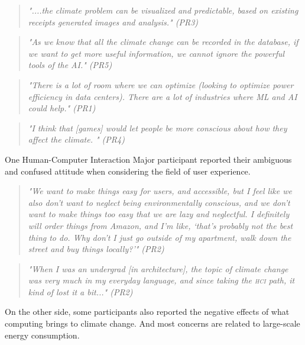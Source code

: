     \begin{quote}
        \textit{
        "....the climate problem can be visualized and predictable, based on existing receipts generated images and analysis." (PR3)
        }
    \end{quote}
    
    \begin{quote}
        \textit{
        "As we know that all the climate change can be recorded in the database, if we want to get more useful information, we cannot ignore the powerful tools of the AI." (PR5)
        }
    \end{quote}
    
    \begin{quote}
        \textit{
        "There is a lot of room where we can optimize (looking to optimize power efficiency in data centers). There are a lot of industries where ML and AI could help." (PR1)
        }
    \end{quote}
    
    \begin{quote}
        \textit{
        "I think that [games] would let people be more conscious about how they affect the climate. " (PR4)
        }
    \end{quote}
    
    One Human-Computer Interaction Major participant reported their ambiguous and confused attitude when considering the field of user experience.
    
    \begin{quote}
        \textit{
        "We want to make things easy for users, and accessible, but I feel like we also don't want to neglect being environmentally conscious, and we don't want to make things too easy that we are lazy and neglectful. I definitely will order things from Amazon, and I'm like, `that's probably not the best thing to do. Why don't I just go outside of my apartment, walk down the street and buy things locally?'" (PR2) %
        }
    \end{quote}
    
    \begin{quote}
        \textit{
        "When I was an undergrad [in architecture], the topic of climate change was very much in my everyday language, and since taking the \textsc{hci} path, it kind of lost it a bit..." (PR2)
        }
    \end{quote}
    
    On the other side, some participants also reported the negative effects of what computing brings to climate change. And most concerns are related to large-scale energy consumption.
    
